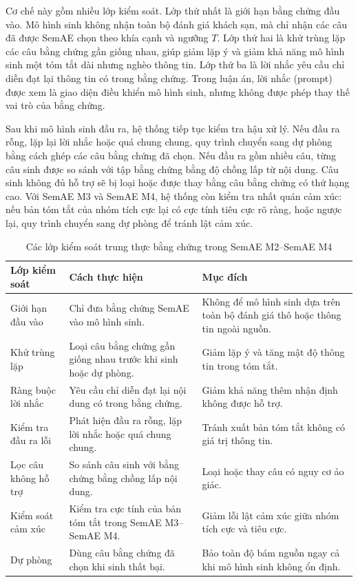 Cơ chế này gồm nhiều lớp kiểm soát. Lớp thứ nhất là giới hạn bằng chứng đầu vào. Mô hình sinh không nhận toàn bộ đánh giá khách sạn, mà chỉ nhận các câu đã được SemAE chọn theo khía cạnh và ngưỡng \(T\). Lớp thứ hai là khử trùng lặp các câu bằng chứng gần giống nhau, giúp giảm lặp ý và giảm khả năng mô hình sinh một tóm tắt dài nhưng nghèo thông tin. Lớp thứ ba là lời nhắc yêu cầu chỉ diễn đạt lại thông tin có trong bằng chứng. Trong luận án, lời nhắc (prompt) được xem là giao diện điều khiển mô hình sinh, nhưng không được phép thay thế vai trò của bằng chứng.

Sau khi mô hình sinh đầu ra, hệ thống tiếp tục kiểm tra hậu xử lý. Nếu đầu ra rỗng, lặp lại lời nhắc hoặc quá chung chung, quy trình chuyển sang dự phòng bằng cách ghép các câu bằng chứng đã chọn. Nếu đầu ra gồm nhiều câu, từng câu sinh được so sánh với tập bằng chứng bằng độ chồng lấp từ nội dung. Câu sinh không đủ hỗ trợ sẽ bị loại hoặc được thay bằng câu bằng chứng có thứ hạng cao. Với SemAE M3 và SemAE M4, hệ thống còn kiểm tra nhất quán cảm xúc: nếu bản tóm tắt của nhóm tích cực lại có cực tính tiêu cực rõ ràng, hoặc ngược lại, quy trình chuyển sang dự phòng để tránh lật cảm xúc.

\begin{table}[tbp]
\centering
\caption{Các lớp kiểm soát trung thực bằng chứng trong SemAE M2--SemAE M4}
\label{tab:method2-faithfulness-controls}
\small
\begin{tabularx}{\textwidth}{L{0.25\textwidth} L{0.30\textwidth} Y}
\toprule
\textbf{Lớp kiểm soát} & \textbf{Cách thực hiện} & \textbf{Mục đích} \\
\midrule
Giới hạn đầu vào & Chỉ đưa bằng chứng SemAE vào mô hình sinh. & Không để mô hình sinh dựa trên toàn bộ đánh giá thô hoặc thông tin ngoài nguồn. \\
Khử trùng lặp & Loại câu bằng chứng gần giống nhau trước khi sinh hoặc dự phòng. & Giảm lặp ý và tăng mật độ thông tin trong tóm tắt. \\
Ràng buộc lời nhắc & Yêu cầu chỉ diễn đạt lại nội dung có trong bằng chứng. & Giảm khả năng thêm nhận định không được hỗ trợ. \\
Kiểm tra đầu ra lỗi & Phát hiện đầu ra rỗng, lặp lời nhắc hoặc quá chung chung. & Tránh xuất bản tóm tắt không có giá trị thông tin. \\
Lọc câu không hỗ trợ & So sánh câu sinh với bằng chứng bằng chồng lấp nội dung. & Loại hoặc thay câu có nguy cơ ảo giác. \\
Kiểm soát cảm xúc & Kiểm tra cực tính của bản tóm tắt trong SemAE M3--SemAE M4. & Giảm lỗi lật cảm xúc giữa nhóm tích cực và tiêu cực. \\
Dự phòng & Dùng câu bằng chứng đã chọn khi sinh thất bại. & Bảo toàn độ bám nguồn ngay cả khi mô hình sinh không ổn định. \\
\bottomrule
\end{tabularx}
\end{table}

